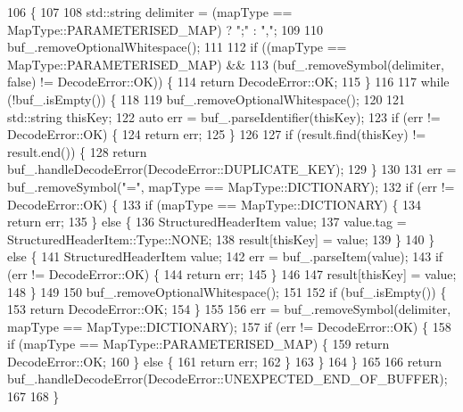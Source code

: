 \begin{DoxyCode}
106                    \{
107 
108   std::string delimiter = (mapType == MapType::PARAMETERISED_MAP) ? \textcolor{stringliteral}{";"} : \textcolor{stringliteral}{","};
109 
110   buf_.removeOptionalWhitespace();
111 
112   \textcolor{keywordflow}{if} ((mapType == MapType::PARAMETERISED_MAP) &&
113       (buf_.removeSymbol(delimiter, \textcolor{keyword}{false}) != DecodeError::OK)) \{
114     \textcolor{keywordflow}{return} DecodeError::OK;
115   \}
116 
117   \textcolor{keywordflow}{while} (!buf_.isEmpty()) \{
118 
119     buf_.removeOptionalWhitespace();
120 
121     std::string thisKey;
122     \textcolor{keyword}{auto} err = buf_.parseIdentifier(thisKey);
123     \textcolor{keywordflow}{if} (err != DecodeError::OK) \{
124       \textcolor{keywordflow}{return} err;
125     \}
126 
127     \textcolor{keywordflow}{if} (result.find(thisKey) != result.end()) \{
128       \textcolor{keywordflow}{return} buf_.handleDecodeError(DecodeError::DUPLICATE\_KEY);
129     \}
130 
131     err = buf_.removeSymbol(\textcolor{stringliteral}{"="}, mapType == MapType::DICTIONARY);
132     \textcolor{keywordflow}{if} (err != DecodeError::OK) \{
133       \textcolor{keywordflow}{if} (mapType == MapType::DICTIONARY) \{
134         \textcolor{keywordflow}{return} err;
135       \} \textcolor{keywordflow}{else} \{
136         StructuredHeaderItem value;
137         value.tag = StructuredHeaderItem::Type::NONE;
138         result[thisKey] = value;
139       \}
140     \} \textcolor{keywordflow}{else} \{
141       StructuredHeaderItem value;
142       err = buf_.parseItem(value);
143       \textcolor{keywordflow}{if} (err != DecodeError::OK) \{
144         \textcolor{keywordflow}{return} err;
145       \}
146 
147       result[thisKey] = value;
148     \}
149 
150     buf_.removeOptionalWhitespace();
151 
152     \textcolor{keywordflow}{if} (buf_.isEmpty()) \{
153       \textcolor{keywordflow}{return} DecodeError::OK;
154     \}
155 
156     err = buf_.removeSymbol(delimiter, mapType == MapType::DICTIONARY);
157     \textcolor{keywordflow}{if} (err != DecodeError::OK) \{
158       \textcolor{keywordflow}{if} (mapType == MapType::PARAMETERISED_MAP) \{
159         \textcolor{keywordflow}{return} DecodeError::OK;
160       \} \textcolor{keywordflow}{else} \{
161         \textcolor{keywordflow}{return} err;
162       \}
163     \}
164   \}
165 
166   \textcolor{keywordflow}{return} buf_.handleDecodeError(DecodeError::UNEXPECTED\_END\_OF\_BUFFER);
167 
168 \}
\end{DoxyCode}
